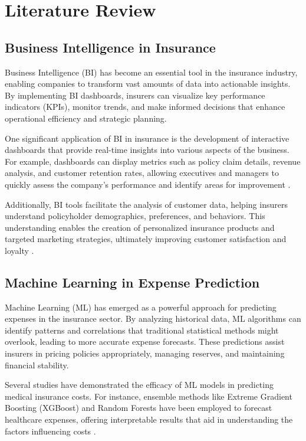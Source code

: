 \chapter{Literature Review}

\section{Business Intelligence in Insurance}

Business Intelligence (BI) has become an essential tool in the insurance industry, enabling companies to transform vast amounts of data into actionable insights. By implementing BI dashboards, insurers can visualize key performance indicators (KPIs), monitor trends, and make informed decisions that enhance operational efficiency and strategic planning.

One significant application of BI in insurance is the development of interactive dashboards that provide real-time insights into various aspects of the business. For example, dashboards can display metrics such as policy claim details, revenue analysis, and customer retention rates, allowing executives and managers to quickly assess the company's performance and identify areas for improvement \cite{BoldBI2023}.

Additionally, BI tools facilitate the analysis of customer data, helping insurers understand policyholder demographics, preferences, and behaviors. This understanding enables the creation of personalized insurance products and targeted marketing strategies, ultimately improving customer satisfaction and loyalty \cite{CoverGo2023}.

\section{Machine Learning in Expense Prediction}

Machine Learning (ML) has emerged as a powerful approach for predicting expenses in the insurance sector. By analyzing historical data, ML algorithms can identify patterns and correlations that traditional statistical methods might overlook, leading to more accurate expense forecasts. These predictions assist insurers in pricing policies appropriately, managing reserves, and maintaining financial stability.

Several studies have demonstrated the efficacy of ML models in predicting medical insurance costs. For instance, ensemble methods like Extreme Gradient Boosting (XGBoost) and Random Forests have been employed to forecast healthcare expenses, offering interpretable results that aid in understanding the factors influencing costs \cite{Orji2023}.


